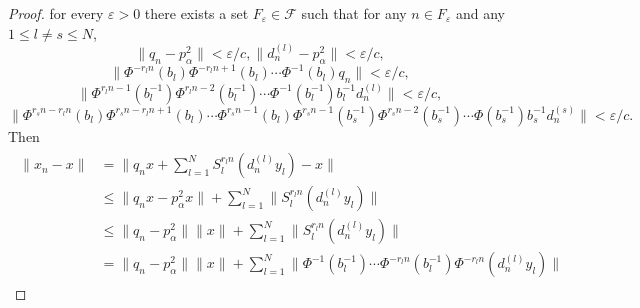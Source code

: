 \documentclass{article}
\begin{document}
\begin{proof}
for every $\varepsilon>0$ there exists a set $F_{\varepsilon}\in\mathcal{F}$ such that for any $n\in F_{\varepsilon}$ and any $1\leq l\neq s \leq N$,
\[\|q_{n}-p^{2}_{\alpha}\|<\varepsilon/c, \|d^{(l)}_{n}-p^{2}_{\alpha}\|<\varepsilon/c,\]
\[\|\Phi^{-r_{l}n}(b_{l})\Phi^{-r_{l}n+1}(b_{l})\cdots \Phi^{-1}(b_{l})q_{n}\|<\varepsilon/c,\]
\[\|\Phi^{r_{l}n-1}(b^{-1}_{l})\Phi^{r_{l}n-2}(b^{-1}_{l})\cdots\Phi^{-1}(b^{-1}_{l})b^{-1}_{l}d^{(l)}_{n}\|<\varepsilon/c,\]
\[\|\Phi^{r_{s}n-r_{l}n}(b_{l})\Phi^{r_{s}n-r_{l}n+1}(b_{l})\cdots\Phi^{r_{s}n-1}(b_{l})\Phi^{r_{s}n-1}(b^{-1}_{s})\Phi^{r_{s}n-2}(b^{-1}_{s})\cdots \Phi(b^{-1}_{s})b^{-1}_{s}d^{(s)}_{n}\|<\varepsilon/c.\]
Then 
\begin{eqnarray}\begin{split}\nonumber
\|x_{n}-x\|&=\|q_{n}x+\sum^{N}_{l=1}S^{r_{l}n}_{l}(d^{(l)}_{n}y_{l})-x\|
\\
&\leq \|q_{n}x-p^{2}_{\alpha}x\|+\sum^{N}_{l=1}\|S^{r_{l}n}_{l}(d^{(l)}_{n}y_{l})\|
\\
&\leq\|q_{n}-p^{2}_{\alpha}\|\|x\|+\sum^{N}_{l=1}\|S^{r_{l}n}_{l}(d^{(l)}_{n}y_{l})\|
\\
&=\|q_{n}-p^{2}_{\alpha}\|\|x\|+\sum^{N}_{l=1}\|\Phi^{-1} (b^{-1}_{l})\cdots \Phi^{-r_{l}n} (b^{-1}_{l})\Phi^{-r_{l}n} (d^{(l)}_{n}y_{l})\|
\end{split}
\end{eqnarray}


\end{proof}
\end{document}
